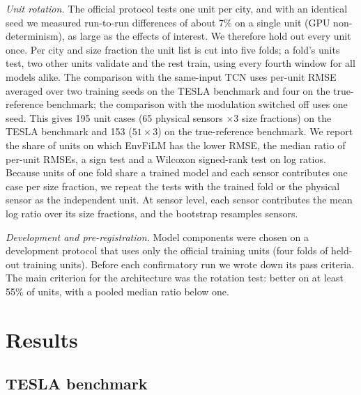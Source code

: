 \documentclass[journal]{IEEEtran}
\begin{document}
\textit{Unit rotation.} The official protocol tests one unit per city, and with an identical seed we measured
run-to-run differences of about 7\% on a single unit (GPU non-determinism), as large as the effects of interest. We
therefore hold out every unit once. Per city and size fraction the unit list is cut into five folds; a fold's units
test, two other units validate and the rest train, using every fourth window for all models alike. The comparison with
the same-input TCN uses per-unit RMSE averaged over two training seeds on the TESLA benchmark and four on the
true-reference benchmark; the comparison with the modulation switched off uses one seed. This gives 195 unit cases (65 physical sensors $\times3$ size fractions) on
the TESLA benchmark and 153 ($51\times3$) on the true-reference benchmark. We report the share of units on which EnvFiLM has the
lower RMSE, the median ratio of per-unit RMSEs, a sign test and a Wilcoxon signed-rank test on log ratios. Because
units of one fold share a trained model and each sensor contributes one case per size fraction, we repeat the tests with
the trained fold or the physical sensor as the independent unit. At sensor level, each sensor contributes the mean log
ratio over its size fractions, and the bootstrap resamples sensors.

\textit{Development and pre-registration.} Model components were chosen on a development protocol that uses only the
official training units (four folds of held-out training units). Before each confirmatory run we wrote down its pass
criteria. The main criterion for the architecture was the rotation test: better on at least 55\% of units, with a
pooled median ratio below one.

\section{Results}
\label{sec:results}

\subsection{TESLA benchmark}
\end{document}
